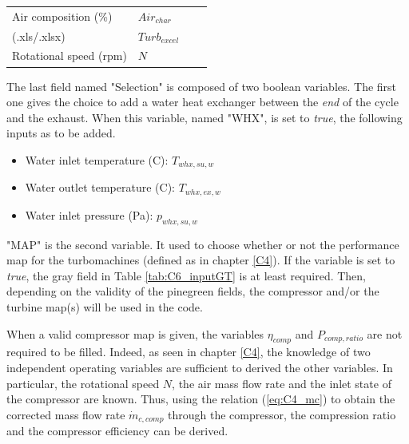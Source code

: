 \begin{longtable}[c]{ll|ll}
Air composition (\%)                                                                   & $Air_{char}$          & \begin{tabular}[c]{@{}l@{}}{\color{PineGreen}{Turbine}} \\ {\color{PineGreen}{performance map}} (.xls/.xlsx)\end{tabular}    & $Turb_{excel}$        \\
{\color{Gray} Rotational speed} (rpm)                                                  & $N$                   &                                                                                                        &                       \\* \bottomrule
\end{longtable}

The last field named "Selection" is composed of two boolean variables. The first one gives the choice to add a water heat exchanger between the \textit{end} of the cycle and the exhaust. When this variable, named "WHX", is set to \textit{true}, the following inputs as to be added.

\begin{itemize}
\item Water inlet temperature (\degree C): $T_{whx,su,w}$
\item Water outlet temperature (\degree C): $T_{whx,ex,w}$
\item Water inlet pressure (Pa): $p_{whx,su,w}$
\end{itemize}

"MAP" is the second variable. It used to choose whether or not the performance map for the turbomachines (defined as in chapter \ref{C4}). If the variable is set to \textit{true}, the {\color{Gray} gray} field in Table \ref{tab:C6_inputGT} is at least required. Then, depending on the validity of the {\color{PineGreen} pinegreen} fields, the compressor and/or the turbine map(s) will be used in the code. 

When a valid compressor map is given, the variables $\eta_{comp}$ and $P_{comp,ratio}$ are not required to be filled. Indeed, as seen in chapter \ref{C4}, the knowledge of two independent operating variables are sufficient to derived the other variables. In particular, the rotational speed $N$, the air mass flow rate and the inlet state of the compressor are known. Thus, using the relation (\ref{eq:C4_mc}) to obtain the corrected mass flow rate $\dot{m}_{c,comp}$ through the compressor, the compression ratio and the compressor efficiency can be derived.  

